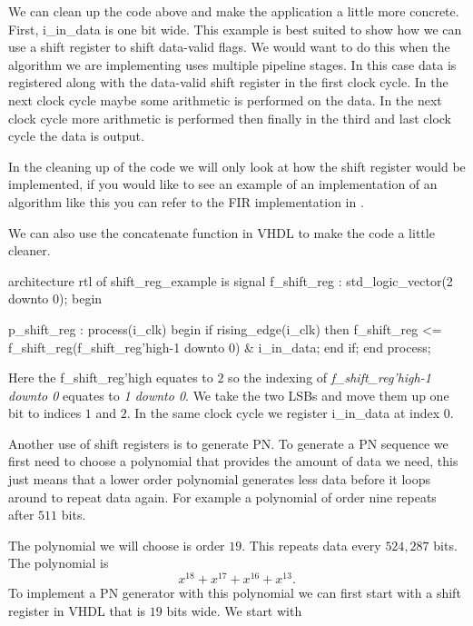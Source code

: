 We can clean up the code above and make the application a little more concrete. First, i\_in\_data is one bit wide. This example is best suited to show how we can use a shift register to shift data-valid flags. We would want to do this when the algorithm we are implementing uses multiple pipeline stages. In this case data is registered along with the data-valid shift register in the first clock cycle. In the next clock cycle maybe some arithmetic is performed on the data. In the next clock cycle more arithmetic is performed then finally in the third and last clock cycle the data is output. 

In the cleaning up of the code we will only look at how the shift register would be implemented, if you would like to see an example of an implementation of an algorithm like this you can refer to the \ac{FIR} implementation in .

We can also use the concatenate function in \ac{VHDL} to make the code a little cleaner.

\begin{VHDLlisting}[tabsize=4]
architecture rtl of shift_reg_example is
	signal f_shift_reg : std_logic_vector(2 downto 0);
begin

p_shift_reg : process(i_clk)
begin
	if rising_edge(i_clk) then
		f_shift_reg <= f_shift_reg(f_shift_reg'high-1 downto 0) & i_in_data;
	end if;
end process;
\end{VHDLlisting}

Here the f\_shift\_reg'high equates to $2$ so the indexing of \emph{f\_shift\_reg'high-1 downto 0} equates to \emph{1 downto 0}. We take the two \ac{LSB}s and move them up one bit to indices $1$ and $2$. In the same clock cycle we register i\_in\_data at index $0$.

Another use of shift registers is to generate \ac{PN}. To generate a \ac{PN} sequence we first need to choose a polynomial that provides the amount of data we need, this just means that a lower order polynomial generates less data before it loops around to repeat data again. For example a polynomial of order nine repeats after $511$ bits. 

The polynomial we will choose is order $19$. This repeats data every $524,287$ bits. The polynomial is 
\begin{equation}
x^{18} + x^{17} + x^{16} + x^{13}. 
\label{eq:pneq}
\end{equation}
\noindent
To implement a \ac{PN} generator with this polynomial we can first start with a shift register in \ac{VHDL} that is $19$ bits wide. We start with 

